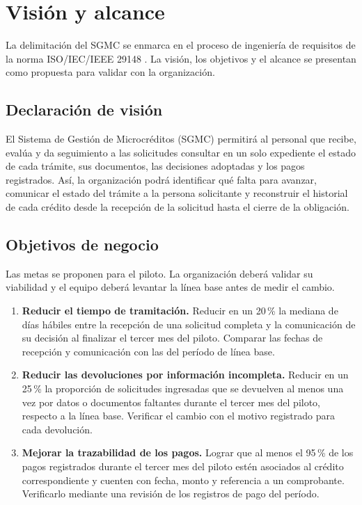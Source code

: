 \documentclass[11pt,a4paper]{article}
\begin{document}
\section{Visión y alcance}
La delimitación del SGMC se enmarca en el proceso de ingeniería de requisitos de la norma ISO/IEC/IEEE 29148 \cite{iso29148}. La visión, los objetivos y el alcance se presentan como propuesta para validar con la organización.

\subsection{Declaración de visión}
El Sistema de Gestión de Microcréditos (SGMC) permitirá al personal que recibe, evalúa y da seguimiento a las solicitudes consultar en un solo expediente el estado de cada trámite, sus documentos, las decisiones adoptadas y los pagos registrados. Así, la organización podrá identificar qué falta para avanzar, comunicar el estado del trámite a la persona solicitante y reconstruir el historial de cada crédito desde la recepción de la solicitud hasta el cierre de la obligación.

\subsection{Objetivos de negocio}
Las metas se proponen para el piloto. La organización deberá validar su viabilidad y el equipo deberá levantar la línea base antes de medir el cambio.

\begin{enumerate}
  \item \textbf{Reducir el tiempo de tramitación.} Reducir en un 20\,\% la mediana de días hábiles entre la recepción de una solicitud completa y la comunicación de su decisión al finalizar el tercer mes del piloto. Comparar las fechas de recepción y comunicación con las del período de línea base.
  \item \textbf{Reducir las devoluciones por información incompleta.} Reducir en un 25\,\% la proporción de solicitudes ingresadas que se devuelven al menos una vez por datos o documentos faltantes durante el tercer mes del piloto, respecto a la línea base. Verificar el cambio con el motivo registrado para cada devolución.
  \item \textbf{Mejorar la trazabilidad de los pagos.} Lograr que al menos el 95\,\% de los pagos registrados durante el tercer mes del piloto estén asociados al crédito correspondiente y cuenten con fecha, monto y referencia a un comprobante. Verificarlo mediante una revisión de los registros de pago del período.
\end{enumerate}
\end{document}
